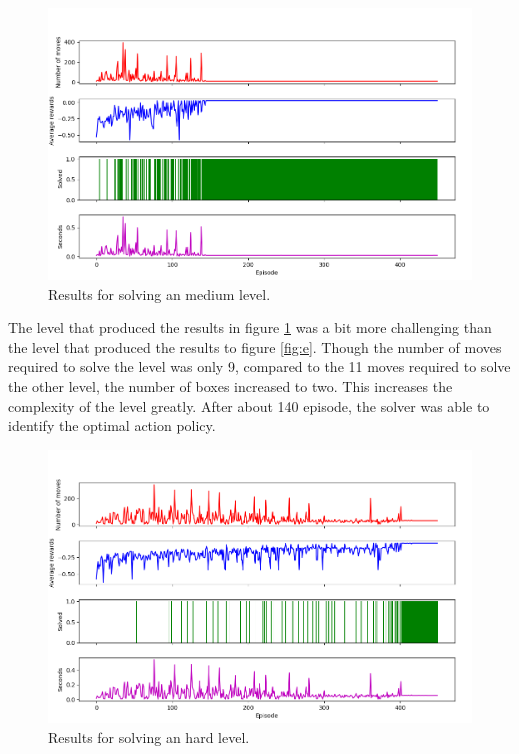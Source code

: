 \documentclass[times, 10pt,twocolumn]{article}
\begin{document}
\begin{figure}[h] 
  \centering
     \includegraphics[width=\linewidth]{images/medium_graph.png}
  \caption{Results for solving an medium level.}
  \label{fig:m}
\end{figure}

The level that produced the results in figure \ref{fig:m} was a bit more challenging than the level that produced the results to figure \ref{fig:e}. Though the number of moves required to solve the level was only 9, compared to the 11 moves required to solve the other level, the number of boxes increased to two. This increases the complexity of the level greatly. After about 140 episode, the solver was able to identify the optimal action policy.  

\begin{figure}[h] 
  \centering
     \includegraphics[width=\linewidth]{images/hard_graph.png}
  \caption{Results for solving an hard level.}
  \label{fig:h}
\end{figure}
\end{document}
